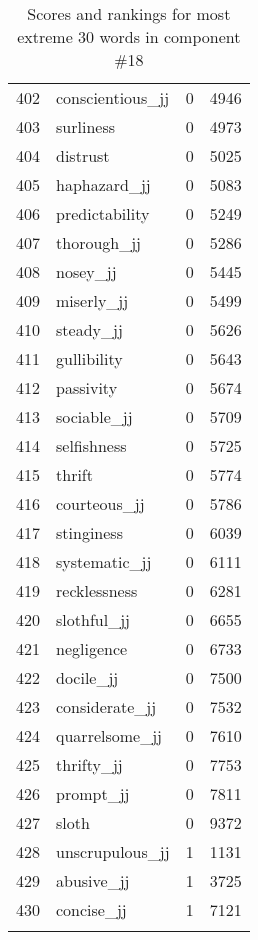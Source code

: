 \begin{longtable}[!htbp]{| rlr@{.}l |}
    402 & conscientious\_jj & 0 & 4946 \\
    403 & surliness & 0 & 4973 \\
    404 & distrust & 0 & 5025 \\
    405 & haphazard\_jj & 0 & 5083 \\
    406 & predictability & 0 & 5249 \\
    407 & thorough\_jj & 0 & 5286 \\
    408 & nosey\_jj & 0 & 5445 \\
    409 & miserly\_jj & 0 & 5499 \\
    410 & steady\_jj & 0 & 5626 \\
    411 & gullibility & 0 & 5643 \\
    412 & passivity & 0 & 5674 \\
    413 & sociable\_jj & 0 & 5709 \\
    414 & selfishness & 0 & 5725 \\
    415 & thrift & 0 & 5774 \\
    416 & courteous\_jj & 0 & 5786 \\
    417 & stinginess & 0 & 6039 \\
    418 & systematic\_jj & 0 & 6111 \\
    419 & recklessness & 0 & 6281 \\
    420 & slothful\_jj & 0 & 6655 \\
    421 & negligence & 0 & 6733 \\
    422 & docile\_jj & 0 & 7500 \\
    423 & considerate\_jj & 0 & 7532 \\
    424 & quarrelsome\_jj & 0 & 7610 \\
    425 & thrifty\_jj & 0 & 7753 \\
    426 & prompt\_jj & 0 & 7811 \\
    427 & sloth & 0 & 9372 \\
    428 & unscrupulous\_jj & 1 & 1131 \\
    429 & abusive\_jj & 1 & 3725 \\
    430 & concise\_jj & 1 & 7121 \\
    \hline
    \caption{Scores and rankings for most extreme 30 words in component \#18} \\
\end{longtable}
